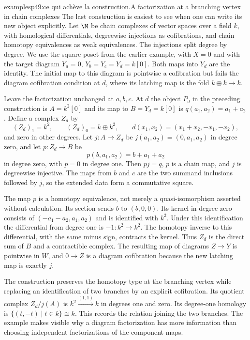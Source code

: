 \begin{dcomment}{examples}{p49:ce qui achève la construction.}{A factorization at a branching vertex in chain complexes}
The last construction is easiest to see when one can write its new object explicitly. Let $\M$ be chain complexes of vector spaces over a field $k$, with homological differentials, degreewise injections as cofibrations, and chain homotopy equivalences as weak equivalences. The injections split degree by degree. We use the square poset from the earlier example, with $X=0$ and with the target diagram $Y_a=0$, $Y_b=Y_c=Y_d=k[0]$. Both maps into $Y_d$ are the identity. The initial map to this diagram is pointwise a cofibration but fails the diagram cofibration condition at $d$, where its latching map is the fold $k\oplus k\to k$.

Leave the factorization unchanged at $a,b,c$. At $d$ the object $P_d$ in the preceding construction is $A=k^2[0]$ and its map to $B=Y_d=k[0]$ is $q(a_1,a_2)=a_1+a_2$. Define a complex $Z_d$ by
\[
 (Z_d)_1=k^2,\qquad (Z_d)_0=k\oplus k^2,
 \qquad d(x_1,x_2)=(x_1+x_2,-x_1,-x_2),
\]
and zero in other degrees. Let $j:A\to Z_d$ be $j(a_1,a_2)=(0,a_1,a_2)$ in degree zero, and let $p:Z_d\to B$ be
\[
 p(b,a_1,a_2)=b+a_1+a_2
\]
in degree zero, with $p=0$ in degree one. Then $pj=q$, $p$ is a chain map, and $j$ is degreewise injective. The maps from $b$ and $c$ are the two summand inclusions followed by $j$, so the extended data form a commutative square.

The map $p$ is a homotopy equivalence, not merely a quasi-isomorphism asserted without calculation. Its section sends $b$ to $(b,0,0)$. Its kernel in degree zero consists of $(-a_1-a_2,a_1,a_2)$ and is identified with $k^2$. Under this identification the differential from degree one is $-1:k^2\to k^2$. The homotopy inverse to this differential, with the same minus sign, contracts the kernel. Thus $Z_d$ is the direct sum of $B$ and a contractible complex. The resulting map of diagrams $Z\to Y$ is pointwise in $W$, and $0\to Z$ is a diagram cofibration because the new latching map is exactly $j$.

The construction preserves the homotopy type at the branching vertex while replacing an identification of two branches by an explicit cofibration. Its quotient complex $Z_d/j(A)$ is $k^2\xrightarrow{(1,1)}k$ in degrees one and zero. Its degree-one homology is $\{(t,-t)\mid t\in k\}\cong k$. This records the relation joining the two branches. The example makes visible why a diagram factorization has more information than choosing independent factorizations of the component maps.
\end{dcomment}

